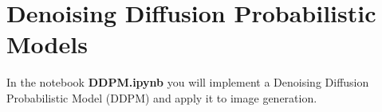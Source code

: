 \section{Denoising Diffusion Probabilistic Models}

 In the notebook \textbf{DDPM.ipynb} you will implement a Denoising Diffusion Probabilistic Model (DDPM) and apply it to image generation.
